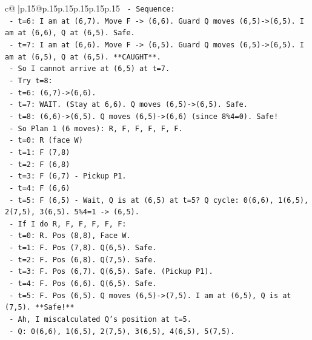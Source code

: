 \documentclass{article}
\begin{document}
{\begin{supertabular}{c@{$\;$}|p{.15\linewidth}@{}p{.15\linewidth}p{.15\linewidth}p{.15\linewidth}p{.15\linewidth}p{.15\linewidth}}
{{{\texttt{        {-} Sequence:} \\
\texttt{            {-} t=6: I am at (6,7). Move F {-}> (6,6). Guard Q moves (6,5){-}>(6,5). I am at (6,6), Q at (6,5). Safe.} \\
\texttt{            {-} t=7: I am at (6,6). Move F {-}> (6,5). Guard Q moves (6,5){-}>(6,5). I am at (6,5), Q at (6,5). **CAUGHT**.} \\
\texttt{        {-} So I cannot arrive at (6,5) at t=7.} \\
\texttt{        {-} Try t=8:} \\
\texttt{            {-} t=6: (6,7){-}>(6,6).} \\
\texttt{            {-} t=7: WAIT. (Stay at 6,6). Q moves (6,5){-}>(6,5). Safe.} \\
\texttt{            {-} t=8: (6,6){-}>(6,5). Q moves (6,5){-}>(6,6) (since 8\%4=0). Safe!} \\
\texttt{        {-} So Plan 1 (6 moves): R, F, F, F, F, F.} \\
\texttt{            {-} t=0: R (face W)} \\
\texttt{            {-} t=1: F (7,8)} \\
\texttt{            {-} t=2: F (6,8)} \\
\texttt{            {-} t=3: F (6,7) {-} Pickup P1.} \\
\texttt{            {-} t=4: F (6,6)} \\
\texttt{            {-} t=5: F (6,5) {-} Wait, Q is at (6,5) at t=5? Q cycle: 0(6,6), 1(6,5), 2(7,5), 3(6,5). 5\%4=1 {-}> (6,5).} \\
\texttt{            {-} If I do R, F, F, F, F, F:} \\
\texttt{                {-} t=0: R. Pos (8,8), Face W.} \\
\texttt{                {-} t=1: F. Pos (7,8). Q(6,5). Safe.} \\
\texttt{                {-} t=2: F. Pos (6,8). Q(7,5). Safe.} \\
\texttt{                {-} t=3: F. Pos (6,7). Q(6,5). Safe. (Pickup P1).} \\
\texttt{                {-} t=4: F. Pos (6,6). Q(6,5). Safe.} \\
\texttt{                {-} t=5: F. Pos (6,5). Q moves (6,5){-}>(7,5). I am at (6,5), Q is at (7,5). **Safe!**} \\
\texttt{            {-} Ah, I miscalculated Q's position at t=5.} \\
\texttt{            {-} Q: 0(6,6), 1(6,5), 2(7,5), 3(6,5), 4(6,5), 5(7,5).} \\
}}}
\end{supertabular}}
\end{document}
